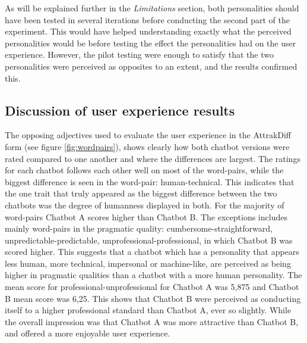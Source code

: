 As will be explained further in the \textit{Limitations} section, both personalities should have been tested in several iterations before conducting the second part of the experiment. This would have helped understanding exactly what the perceived personalities would be before testing the effect the personalities had on the user experience. However, the pilot testing were enough to satisfy that the two personalities were perceived as opposites to an extent, and the results confirmed this.

\subsection{Discussion of user experience results}

The opposing adjectives used to evaluate the user experience in the AttrakDiff form (see figure \ref{fig:wordpairs}), shows clearly how both chatbot versions were rated compared to one another and where the differences are largest. The ratings for each chatbot follows each other well on most of the word-pairs, while the biggest difference is seen in the word-pair: human-technical. This indicates that the one trait that truly appeared as the biggest difference between the two chatbots was the degree of humanness displayed in both. For the majority of word-pairs Chatbot A scores higher than Chatbot B. The exceptions includes mainly word-pairs in the pragmatic quality: cumbersome-straightforward, unpredictable-predictable, unprofessional-professional, in which Chatbot B was scored higher. This suggests that a chatbot which has a personality that appears less human, more technical, impersonal or machine-like, are perceived as being higher in pragmatic qualities than a chatbot with a more human personality. The mean score for professional-unprofessional for Chatbot A was 5,875 and Chatbot B mean score was 6,25. This shows that Chatbot B were perceived as conducting itself to a higher professional standard than Chatbot A, ever so slightly. While the overall impression was that Chatbot A was more attractive than Chatbot B, and offered a more enjoyable user experience. 

